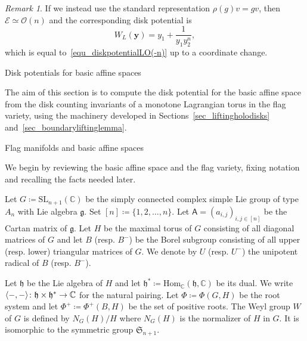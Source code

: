 \documentclass[11pt]{amsart}
\makeatletter
\def\section{\@startsection{section}{1}%
  \z@{-1.2\linespacing\@plus-.5\linespacing}{.8\linespacing}%
  {\normalfont\bfseries\large}}
\def\subsection{\@startsection{subsection}{2}%
  \z@{-.8\linespacing\@plus-.3\linespacing}{.3\linespacing\@plus.2\linespacing}%
  {\normalfont\bfseries}}
\theoremstyle{plain}
\theoremstyle{definition}
\theoremstyle{remark}
\newtheorem{remark}[theorem]{Remark}
\newcommand{\C}{\mathbb{C}}
\numberwithin{equation}{section} \numberwithin{table}{section}
\def\to{\mathchoice{\longrightarrow}{\rightarrow}{\rightarrow}{\rightarrow}}
\numberwithin{equation}{section}
\makeatother
\begin{document}
\begin{remark}
If we instead use the standard representation $\rho(g) v = g v$, then $\mathcal{E} \simeq \mathcal{O}(n)$ and the corresponding disk potential is
$$
W_L(\mathbf{y}) = y_1 + \frac{1}{y_1y_2^n},
$$
which is equal to~\eqref{equ_diskpotentialLO(-n)} up to a coordinate change. 
\end{remark}





\section{Disk potentials for basic affine spaces}\label{sec_diskpotentialbasicaffinespaces}

The aim of this section is to compute the disk potential for the basic affine space from the disk counting invariants of a monotone Lagrangian torus in the flag variety, using the machinery developed in Sections~\ref{sec_liftingholodisks} and~\ref{sec_boundaryliftinglemma}. 

\subsection{Flag manifolds and basic affine spaces}

We begin by reviewing the basic affine space and the flag variety, fixing notation and recalling the facts needed later.

Let $G \coloneqq \mathrm{SL}_{n+1}(\C)$ be the simply connected complex simple Lie group of type $A_n$ with Lie algebra $\mathfrak{g}$. Set $[n] \coloneqq \{1, 2, \dots, n\}$. Let $\mathsf{A} = (a_{i,j})_{i,j\in [n]}$ be the Cartan matrix of $\mathfrak{g}$. Let $H$ be the maximal torus of $G$ consisting of all diagonal matrices of $G$ and let $B$ (resp. $B^-$) be the Borel subgroup consisting of all upper (resp. lower) triangular matrices of $G$. We denote by $U$ (resp. $U^-$) the unipotent radical of $B$ (resp. $B^-$).

Let $\mathfrak{h}$ be the Lie algebra of $H$ and let $\mathfrak{h}^* \coloneqq \mathrm{Hom}_\mathbb{C}(\mathfrak{h}, \mathbb{C})$ be its dual. We write 
$
\langle- , -  \rangle \colon \mathfrak{h} \times \mathfrak{h}^* \to \C 
$ for the natural pairing. Let $\Phi \coloneqq \Phi(G,H)$ be the root system and let $\Phi^+ \coloneqq \Phi^+(B,H)$ be the set of positive roots. The Weyl group $W$ of $G$ is defined by $N_G(H)/H$ where $N_G(H)$ is the normalizer of $H$ in $G$. It is isomorphic to the symmetric group $\mathfrak{S}_{n+1}$.
\end{document}
